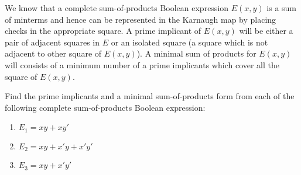 \documentclass[../main-sheet.tex]{subfiles}
\begin{document}
We know that a complete sum-of-products Boolean expression $ E(x, y) $ is a sum of minterms and hence can be represented in the Karnaugh map by placing checks in the appropriate square. A prime implicant of $ E(x, y) $ will be either a pair of adjacent squares in $ E $ or an isolated square (a square which is not adjacent to other square of $ E(x,y) $). A minimal sum of products for $ E(x,y) $ will consists of a minimum number of a prime implicants which cover all the square of $ E(x,y) $.
\begin{prob}
    Find the prime implicants and a minimal sum-of-products form from each of the following complete sum-of-products Boolean expression:
    \begin{enumerate}[label=(\alph*)]
        \item $ E_1=xy+xy' $
        \item $ E_2=xy+x'y+x'y' $
        \item $ E_3=xy+x'y' $
    \end{enumerate}
\end{prob}
\newpage
\end{document}
